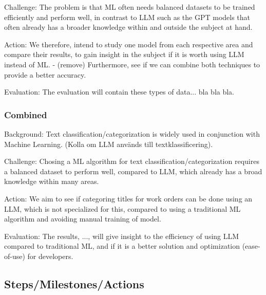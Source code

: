 \documentclass{article}
\begin{document}
Challenge:
The problem is that ML often needs balanced datasets to be trained efficiently and perform well,
in contrast to LLM such as the GPT models that often already has a broader knowledge within and
outside the subject at hand.

Action:
We therefore, intend to study one model from each respective area and compare their results,
to gain insight in the subject if it is worth using LLM instead of ML.
- (remove) Furthermore, see if we can combine both techniques to provide a better accuracy.

Evaluation:
The evaluation will contain these types of data... bla bla bla.

\subsubsection{Combined}

Background:
Text classification/categorization is widely used in conjunction with Machine Learning.
(Kolla om LLM används till textklassificering).

Challenge:
Chosing a ML algorithm for text classification/categorization requires a balanced dataset to
perform well, compared to LLM, which already has a broad knowledge within many areas.

Action:
We aim to see if categoring titles for work orders can be done using an LLM, which is not
specialized for this, compared to using a traditional ML algorithm and avoiding manual training
of model.

Evaluation:
The results, ..., will give insight to the efficiency of using LLM compared to traditional ML,
and if it is a better solution and optimization (ease-of-use) for developers.

\subsection{Steps/Milestones/Actions}
\end{document}
